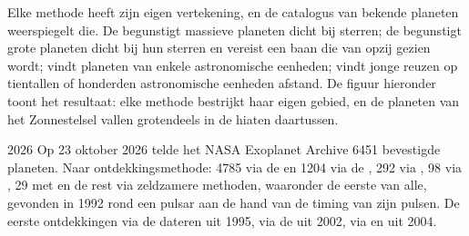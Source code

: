 Elke methode heeft zijn eigen vertekening, en de catalogus van bekende planeten
weerspiegelt die. De  begunstigt massieve planeten dicht bij
sterren; de  begunstigt grote planeten dicht bij hun sterren en vereist
een baan die van opzij gezien wordt;  vindt planeten van
enkele astronomische eenheden;  vindt jonge reuzen op tientallen of honderden astronomische eenheden afstand.
De figuur hieronder toont het resultaat: elke methode bestrijkt haar eigen gebied, en
de planeten van het Zonnestelsel vallen grotendeels in de hiaten daartussen.

\begin{dated}{2026}
Op 23 oktober 2026 telde het NASA Exoplanet Archive 6451 bevestigde
planeten. Naar ontdekkingsmethode: 4785 via de  en 1204 via de
, 292 via , 98 via , 29 met
 en de rest via zeldzamere methoden, waaronder de eerste van alle,
gevonden in 1992 rond een pulsar aan de hand van de timing van zijn pulsen. De eerste
ontdekkingen via de  dateren uit 1995, via de  uit 2002, via
 en  uit 2004.
\end{dated}

